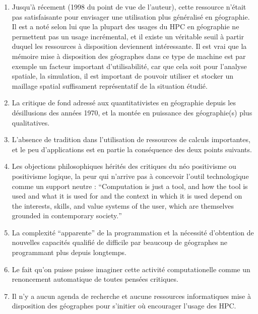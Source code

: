 \begin{enumerate}[label=(\alph*),labelindent=\parindent,leftmargin=*]
\item Jusqu’à récement (1998 du point de vue de l’auteur), cette ressource n’était pas satisfaisante pour envisager une utilisation plus généralisé en géographie. Il est a noté selon lui que la plupart des usages du HPC en géographie ne permettent pas un usage incrémental, et il existe un véritable seuil à partir duquel les ressources à disposition deviennent intéressante. Il est vrai que la mémoire mise à disposition des géographes dans ce type de machine est par exemple un facteur important d’utilisabilité, car que cela soit pour l’analyse spatiale, la simulation, il est important de pouvoir utiliser et stocker un maillage spatial suffisament représentatif de la situation étudié.
\item  La critique de fond adressé aux quantitativistes en géographie depuis les désillusions des années 1970, et la montée en puissance des géographie(s) plus qualitatives.
\item L’absence de tradition dans l’utilisation de ressources de calculs importantes, et le peu d’applications est en partie la conséquence des deux points suivants.
\item  Les objections philosophiques hérités des critiques du néo positivisme ou positivisme logique, la peur qui n’arrive pas à concevoir l’outil technologique comme un support neutre : \foreignquote{english}{Computation is just a tool, and how the tool is used and what it is used for and the context in which it is used depend on the interests, skills, and value systems of the user, which are themselves grounded in contemporary society.}
\item La complexité \enquote{apparente} de la programmation et la nécessité d’obtention de nouvelles capacités qualifié de difficile par beaucoup de géographes ne programmant plus depuis longtemps.
\item Le fait qu’on puisse puisse imaginer cette activité computationelle comme un renoncement automatique de toutes pensées critiques.
\item Il n’y a aucun agenda de recherche et aucune ressources informatiques mise à disposition des géographes pour s’initier où encourager l’usage des HPC.
\end{enumerate}

